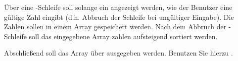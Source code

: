 %
\par Über eine -Schleife soll solange ein  angezeigt werden, wie der Benutzer eine gültige Zahl eingibt (d.h. Abbruch der Schleife bei ungültiger Eingabe). Die Zahlen sollen in einem Array  gespeichert werden. Nach dem Abbruch der -Schleife soll das eingegebene Array zahlen aufsteigend sortiert werden.
%
\par Abschließend soll das Array über  ausgegeben werden. Benutzen Sie hierzu .